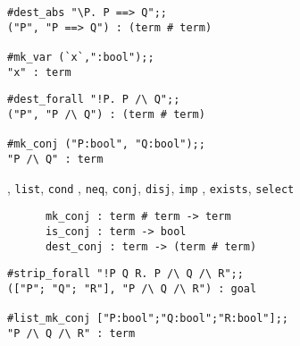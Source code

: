 \begin{session}\begin{verbatim}
#dest_abs "\P. P ==> Q";;
("P", "P ==> Q") : (term # term)

#mk_var (`x`,":bool");;
"x" : term
\end{verbatim}\end{session}


\vskip4mm

\begin{session}\begin{verbatim}
#dest_forall "!P. P /\ Q";;
("P", "P /\ Q") : (term # term)

#mk_conj ("P:bool", "Q:bool");;
"P /\ Q" : term
\end{verbatim}\end{session}



\bspindent\Large
\obeylines
\vskip4mm
, {\tt list}, {\tt cond}
, {\tt neq}, {\tt conj}, {\tt disj}, {\tt imp}
, {\tt exists}, {\tt select}
\espindent


\bspindent\LARGE\bf
\begin{verbatim}
      mk_conj : term # term -> term
      is_conj : term -> bool
      dest_conj : term -> (term # term)
\end{verbatim}
\espindent


\vskip4mm
\begin{session}\begin{verbatim}
#strip_forall "!P Q R. P /\ Q /\ R";;
(["P"; "Q"; "R"], "P /\ Q /\ R") : goal

#list_mk_conj ["P:bool";"Q:bool";"R:bool"];;
"P /\ Q /\ R" : term
\end{verbatim}\end{session}

\vskip7mm

